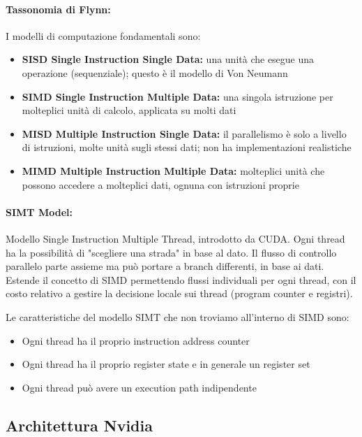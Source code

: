 \paragraph{Tassonomia di Flynn:} I modelli di computazione fondamentali sono: 
\begin{itemize}
	\item \textbf{SISD Single Instruction Single Data:} una unità che esegue una operazione (sequenziale); questo è il modello di Von Neumann
	
	\item \textbf{SIMD Single Instruction Multiple Data:} una singola istruzione per molteplici unità di calcolo, applicata su molti dati
	
	\item \textbf{MISD Multiple Instruction Single Data:} il parallelismo è solo a livello di istruzioni, molte unità sugli stessi dati; non ha implementazioni realistiche
	
	\item \textbf{MIMD Multiple Instruction Multiple Data:} molteplici unità che possono accedere a molteplici dati, ognuna con istruzioni proprie
\end{itemize}

\paragraph{SIMT Model:} Modello Single Instruction Multiple Thread, introdotto da CUDA. Ogni thread ha la possibilità di "scegliere una strada" in base al dato. Il flusso di controllo parallelo parte assieme ma può portare a branch differenti, in base ai dati. Estende il concetto di SIMD permettendo flussi individuali per ogni thread, con il costo relativo a gestire la decisione locale sui thread (program counter e registri).
\label{par:simt}

Le caratteristiche del modello SIMT che non troviamo all'interno di SIMD sono: 
\begin{itemize}
	\item Ogni thread ha il proprio instruction address counter
	
	\item Ogni thread ha il proprio register state e in generale un register set 
	
	\item Ogni thread può avere un execution path indipendente
\end{itemize}

\subsection{Architettura Nvidia}

